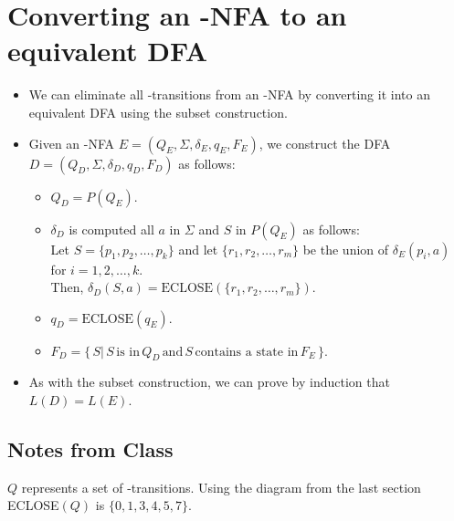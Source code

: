 \documentclass[]{article}
\begin{document}
\section{Converting an \textepsilon-NFA to an equivalent DFA}
  \begin{itemize}
    \item We can eliminate all \textepsilon-transitions from an \textepsilon-NFA
    by converting it into an equivalent DFA using the subset construction.
    \item Given an \textepsilon-NFA $E = (Q_E, \Sigma, \delta_E, q_E, F_E)$, we
    construct the DFA $D = (Q_D, \Sigma, \delta_D, q_D, F_D)$ as follows:
      \begin{itemize}
        \item $Q_D = P(Q_E)$.
        \item $\delta_D$ is computed all $a$ in $\Sigma$ and $S$ in $P(Q_E)$ as
        follows: \\ Let $S = \{p_1, p_2, \ldots, p_k\}$ and let
        $\{r_1,r_2,\ldots,r_m\}$ be the union of $\delta_E(p_i, a)$ for $i = 1,
        2, \ldots, k$. \\ Then, $\delta_D(S,a) =
        \text{ECLOSE}(\{r_1,r_2,\ldots,r_m\})$.
        \item $q_D = \text{ECLOSE}(q_E)$.
        \item $F_D = \{ \, S | \, S \, \text{is in} \, Q_D \, \text{and} \, S \,
        \text{contains a state in} \, F_E \, \}$.
      \end{itemize}
    \item As with the subset construction, we can prove by induction that
    $L(D) = L(E)$.
  \end{itemize}

  \subsection*{Notes from Class}
    $Q$ represents a set of \textepsilon-transitions. Using the diagram from the
    last section ECLOSE$(Q)$ is $\{0, 1, 3, 4, 5, 7\}$.\\
\end{document}
